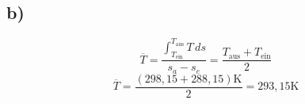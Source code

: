 

\subsection*{b)}
\[
\overline{T} = \frac{\int_{T_{\text{ein}}}^{T_{\text{aus}}} T \, ds}{s_a - s_e} = \frac{T_{\text{aus}} + T_{\text{ein}}}{2}
\]
\[
\overline{T} = \frac{(298,15 + 288,15) \text{K}}{2} = 293,15 \text{K}
\]